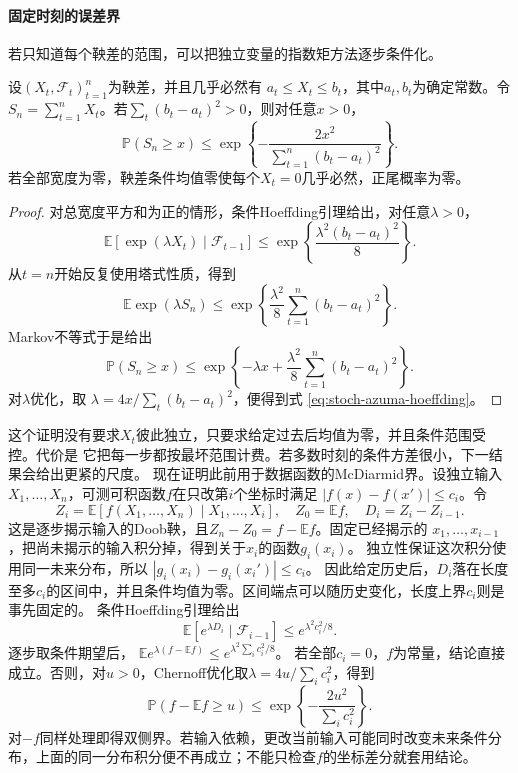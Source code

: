 \paragraph{固定时刻的误差界}
\label{sec:rv-fixed-time}
若只知道每个鞅差的范围，可以把独立变量的指数矩方法逐步条件化。

\begin{theorem}
  \label{thm:stoch-azuma-hoeffding}
  设$(X_t,\mathcal{F}_t)_{t=1}^{n}$为鞅差，并且几乎必然有
  $a_t\leq X_t\leq b_t$，其中$a_t,b_t$为确定常数。令
  $S_n=\sum_{t=1}^{n}X_t$。若$\sum_t(b_t-a_t)^2>0$，则对任意$x>0$，
  \begin{equation}
    \mathbb{P}(S_n\geq x)\leq\exp\left\{
      -\frac{2x^2}{\sum_{t=1}^{n}(b_t-a_t)^2}
    \right\}.
    \label{eq:stoch-azuma-hoeffding}
  \end{equation}
若全部宽度为零，鞅差条件均值零使每个$X_t=0$几乎必然，正尾概率为零。
\end{theorem}

\begin{proof}
对总宽度平方和为正的情形，条件Hoeffding引理给出，对任意$\lambda>0$，
\[
  \mathbb{E}[
    \exp(\lambda X_t)
    \mid\mathcal{F}_{t-1}]
  \leq
  \exp\left\{
    \frac{\lambda^2(b_t-a_t)^2}{8}
  \right\}.
\]
从$t=n$开始反复使用塔式性质，得到
\[
  \mathbb{E}\exp(\lambda S_n)
  \leq
  \exp\left\{
    \frac{\lambda^2}{8}
    \sum_{t=1}^{n}(b_t-a_t)^2
  \right\}.
\]
Markov不等式于是给出
\[
  \mathbb{P}(S_n\geq x)
  \leq
  \exp\left\{
    -\lambda x+
    \frac{\lambda^2}{8}
    \sum_{t=1}^{n}(b_t-a_t)^2
  \right\}.
\]
对$\lambda$优化，取
$\lambda=4x/\sum_t(b_t-a_t)^2$，便得到式
\eqref{eq:stoch-azuma-hoeffding}。
\end{proof}

这个证明没有要求$X_t$彼此独立，只要求给定过去后均值为零，并且条件范围受控。代价是
它把每一步都按最坏范围计费。若多数时刻的条件方差很小，下一结果会给出更紧的尺度。
现在证明此前用于数据函数的McDiarmid界。设独立输入
\(X_1,\ldots,X_n\)，可测可积函数\(f\)在只改第\(i\)个坐标时满足
\(|f(x)-f(x')|\leq c_i\)。令
\[
Z_i=\mathbb E[f(X_1,\ldots,X_n)\mid X_1,\ldots,X_i],
\quad Z_0=\mathbb Ef,\quad D_i=Z_i-Z_{i-1}.
\]
这是逐步揭示输入的Doob鞅，且\(Z_n-Z_0=f-\mathbb Ef\)。固定已经揭示的
\(x_1,\ldots,x_{i-1}\)，把尚未揭示的输入积分掉，得到关于\(x_i\)的函数\(g_i(x_i)\)。
独立性保证这次积分使用同一未来分布，所以
\(|g_i(x_i)-g_i(x_i')|\leq c_i\)。
因此给定历史后，\(D_i\)落在长度至多\(c_i\)的区间中，并且条件均值为零。区间端点可以随历史变化，长度上界\(c_i\)则是事先固定的。
条件Hoeffding引理给出
\[
\mathbb E[e^{\lambda D_i}\mid\mathcal F_{i-1}]
\leq e^{\lambda^2c_i^2/8}.
\]
逐步取条件期望后，
\(\mathbb E e^{\lambda(f-\mathbb Ef)}
\leq e^{\lambda^2\sum_i c_i^2/8}\)。
若全部\(c_i=0\)，\(f\)为常量，结论直接成立。否则，对\(u>0\)，Chernoff优化取\(\lambda=4u/\sum_i c_i^2\)，得到
\[
\mathbb P(f-\mathbb Ef\geq u)
\leq\exp\left\{-\frac{2u^2}{\sum_i c_i^2}\right\}.
\]
对\(-f\)同样处理即得双侧界。若输入依赖，更改当前输入可能同时改变未来条件分布，上面的同一分布积分便不再成立；不能只检查\(f\)的坐标差分就套用结论。

